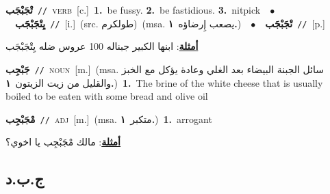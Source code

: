 \documentclass[10pt,a4paper,twoside]{article} %
\begin{document}
\begin{multicols}{2}
{\setlength\topsep{0pt}\textbf{\foreignlanguage{arabic}{تْجَبْجَب}}\ {\color{gray}\texttt{//}\color{black}}\ \textsc{verb}\ [c.]\ \textbf{1.}~be fussy.  \textbf{2.}~be fastidious.  \textbf{3.}~nitpick\ \ $\bullet$\ \ \setlength\topsep{0pt}\textbf{\foreignlanguage{arabic}{يِتْجَبْجَب}}\ {\color{gray}\texttt{//}\color{black}}\ [i.]\ (src. \color{gray}\foreignlanguage{arabic}{طولكرم}\color{black})\ \color{gray}(msa. \foreignlanguage{arabic}{يصعب إِرضاؤه}~\foreignlanguage{arabic}{\textbf{١.}})\color{black}\ \ $\bullet$\ \ \setlength\topsep{0pt}\textbf{\foreignlanguage{arabic}{تْجَبْجَب}}\ {\color{gray}\texttt{//}\color{black}}\ [p.]\  \begin{flushright}\color{gray}\foreignlanguage{arabic}{\textbf{\underline{\foreignlanguage{arabic}{أمثلة}}}: ابنها الكبير جبناله 100 عروس ضله يِتْجَبْجَب}\end{flushright}\color{black}} \vspace{2mm}

{\setlength\topsep{0pt}\textbf{\foreignlanguage{arabic}{جَبْجِب}}\ {\color{gray}\texttt{//}\color{black}}\ \textsc{noun}\ [m.]\ \color{gray}(msa. \foreignlanguage{arabic}{سائل الجبنة البيضاء بعد الغلي وعادة يؤكل مع الخبز والقليل من زيت الزيتون}~\foreignlanguage{arabic}{\textbf{١.}})\color{black}\ \textbf{1.}~The brine of the white cheese that is usually boiled to be eaten with some bread and olive oil\ 

{\setlength\topsep{0pt}\textbf{\foreignlanguage{arabic}{مْجَبْجِب}}\ {\color{gray}\texttt{//}\color{black}}\ \textsc{adj}\ [m.]\ \color{gray}(msa. \foreignlanguage{arabic}{متكبر}~\foreignlanguage{arabic}{\textbf{١.}})\color{black}\ \textbf{1.}~arrogant\  \begin{flushright}\color{gray}\foreignlanguage{arabic}{\textbf{\underline{\foreignlanguage{arabic}{أمثلة}}}: مالك مْجَبْجِب يا اخوي؟}\end{flushright}\color{black}} \vspace{2mm}

\vspace{-3mm}
\subsection*{\color{blue}\foreignlanguage{arabic}{ج.ب.د}\color{blue}{}} 

}
\end{multicols}
\end{document}
